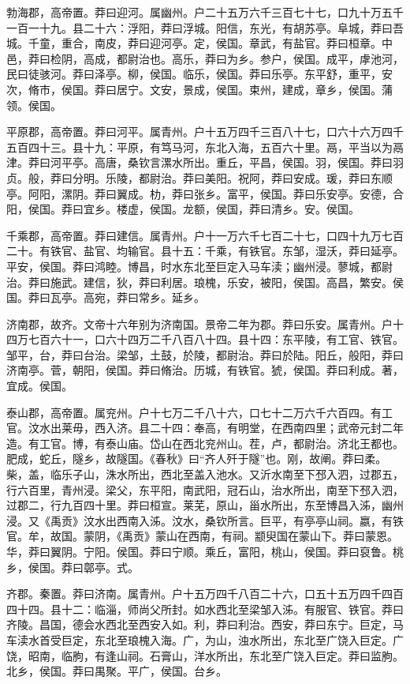 \documentclass[]{article}
\begin{document}
勃海郡，高帝置。莽曰迎河。属幽州。户二十五万六千三百七十七，口九十万五千一百一十九。县二十六：浮阳，莽曰浮城。阳信，东光，有胡苏亭。阜城，莽曰吾城。千童，重合，南皮，莽曰迎河亭。定，侯国。章武，有盐官。莽曰桓章。中邑，莽曰检阴，高成，都尉治也。高乐，莽曰为乡。参户，侯国。成平，虖池河，民曰徒骇河。莽曰泽亭。柳，侯国。临乐，侯国。莽曰乐亭。东平舒，重平，安次，脩市，侯国。莽曰居宁。文安，景成，侯国。束州，建成，章乡，侯国。蒲领。侯国。

平原郡，高帝置。莽曰河平。属青州。户十五万四千三百八十七，口六十六万四千五百四十三。县十九：平原，有笃马河，东北入海，五百六十里。鬲，平当以为鬲津。莽曰河平亭。高唐，桑钦言漯水所出。重丘，平昌，侯国。羽，侯国。莽曰羽贞。般，莽曰分明。乐陵，都尉治。莽曰美阳。祝阿，莽曰安成。瑗，莽曰东顺亭。阿阳，漯阴。莽曰翼成。朸，莽曰张乡。富平，侯国。莽曰乐安亭。安德，合阳，侯国。莽曰宜乡。楼虚，侯国。龙额，侯国，莽曰清乡。安。侯国。

千乘郡，高帝置。莽曰建信。属青州。户十一万六千七百二十七，口四十九万七百二十。有铁官、盐官、均输官。县十五：千乘，有铁官。东邹，湿沃，莽曰延亭。平安，侯国。莽曰鸿睦。博昌，时水东北至巨定入马车渎；幽州浸。蓼城，都尉治。莽曰施武。建信，狄，莽曰利居。琅槐，乐安，被阳，侯国。高昌，繁安。侯国。莽曰瓦亭。高宛，莽曰常乡。延乡。

济南郡，故齐。文帝十六年别为济南国。景帝二年为郡。莽曰乐安。属青州。户十四万七百六十一，口六十四万二千八百八十四。县十四：东平陵，有工官、铁官。邹平，台，莽曰台治。梁邹，土鼓，於陵，都尉治。莽曰於陆。阳丘，般阳，莽曰济南亭。菅，朝阳，侯国。莽曰脩治。历城，有铁官。猇，侯国。莽曰利成。著，宜成。侯国。

泰山郡，高帝置。属兖州。户十七万二千八十六，口七十二万六千六百四。有工官。汶水出莱毋，西入济。县二十四：奉高，有明堂，在西南四里；武帝元封二年造。有工官。博，有泰山庙。岱山在西北兖州山。茬，卢，都尉治。济北王都也。肥成，蛇丘，隧乡，故隧国。《春秋》曰``齐人歼于隧''也。刚，故阐。莽曰柔。柴，盖，临乐子山，洙水所出，西北至盖入池水。又沂水南至下邳入泗，过郡五，行六百里，青州浸。梁父，东平阳，南武阳，冠石山，治水所出，南至下邳入泗，过郡二，行九百四十里。莽曰桓宣。莱芜，原山，甾水所出，东至博昌入泲，幽州浸。又《禹贡》汶水出西南入泲。汶水，桑钦所言。巨平，有亭亭山祠。嬴，有铁官。牟，故国。蒙阴，《禹贡》蒙山在西南，有祠。颛臾国在蒙山下。莽曰蒙恩。华，莽曰翼阴。宁阳。侯国。莽曰宁顺。乘丘，富阳，桃山，侯国。莽曰裒鲁。桃乡，侯国。莽曰鄣亭。式。

齐郡。秦置。莽曰济南。属青州。户十五万四千八百二十六，口五十五万四千四百四十四。县十二：临淄，师尚父所封。如水西北至梁邹入泲。有服官、铁官。莽曰齐陵。昌国，德会水西北至西安入如。利，莽曰利治。西安，莽曰东宁。巨定，马车渎水首受巨定，东北至琅槐入海。广，为山，浊水所出，东北至广饶入巨定。广饶，昭南，临朐，有逢山祠。石膏山，洋水所出，东北至广饶入巨定。莽曰监朐。北乡，侯国。莽曰禺聚。平广，侯国。台乡。
\end{document}
